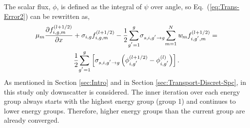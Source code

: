 	The scalar flux, ${\phi}$, is defined as the integral of ${\psi}$ over angle, so 
	Eq.~(\ref{eq:Trans-Error2}) can be rewritten as,
	\begin{multline}
		\mu_{m}\frac{\partial{{f}_{i,g,m}^{\left({l+1/2}\right)}}}{\partial{x}}+
		{\sigma}_{i,g}{{f}_{i,g,m}^{\left({l+1/2}\right)}} - 
		\frac{1}{2}{\sum^{g}_{g^{'}=1}}
		 {\sigma}_{s,i,g^{'}\rightarrow{g}}{{\sum^{N}_{m=1}
		\emph{w}_{m}{f}_{i,g^{'},m}^{\left({l+1/2}\right)}}} = \\
		 \frac{1}{2}{\sum^{g}_{g^{'}=1}}\left[  {\sigma}_{s,i,g^{'}\rightarrow{g}}
		 \left({\phi_{i,g^{'}}^{\left({l+1/2}\right)}}-{\phi_{i,g^{'}}^{\left({l}\right)}}\right)\right].
	\label{eq:Trans-Error3}
	\end{multline}
	As mentioned in Section \ref{sec:Intro} and in Section \ref{sec:Transport-Discret-Spc}, in
	this study only downscatter is considered. The inner iteration over each energy group always
	starts with the highest energy group (group 1) and continues to lower energy groups.  Therefore,
	higher energy groups than the current group are already converged.
	
